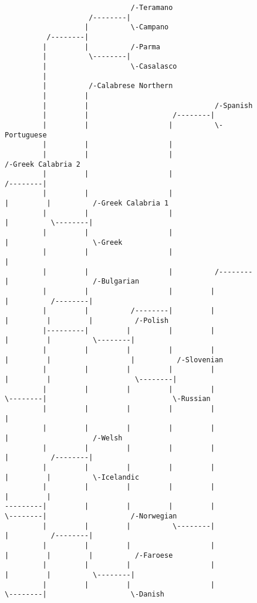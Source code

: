 \begin{figure}[!htb]
\begin{center}
{\begin{verbatim}
                              /-Teramano
                    /--------|
                   |          \-Campano
          /--------|
         |         |          /-Parma
         |          \--------|
         |                    \-Casalasco
         |
         |          /-Calabrese Northern
         |         |
         |         |                              /-Spanish
         |         |                    /--------|
         |         |                   |          \-Portuguese
         |         |                   |
         |         |                   |                              /-Greek Calabria 2
         |         |                   |                    /--------|
         |         |                   |                   |         |          /-Greek Calabria 1
         |         |                   |                   |          \--------|
         |         |                   |                   |                    \-Greek
         |         |                   |                   |
         |         |                   |          /--------|                    /-Bulgarian
         |         |                   |         |         |          /--------|
         |         |          /--------|         |         |         |         |          /-Polish
         |---------|         |         |         |         |         |          \--------|
         |         |         |         |         |         |         |                   |          /-Slovenian
         |         |         |         |         |         |         |                    \--------|
         |         |         |         |         |          \--------|                              \-Russian
         |         |         |         |         |                   |
         |         |         |         |         |                   |                    /-Welsh
         |         |         |         |         |                   |          /--------|
         |         |         |         |         |                   |         |          \-Icelandic
         |         |         |         |         |                   |         |
---------|         |         |         |         |                    \--------|                    /-Norwegian
         |         |         |          \--------|                             |          /--------|
         |         |         |                   |                             |         |         |          /-Faroese
         |         |         |                   |                             |         |          \--------|
         |         |         |                   |                              \--------|                    \-Danish

\end{verbatim}}
\end{center}
\end{figure}
